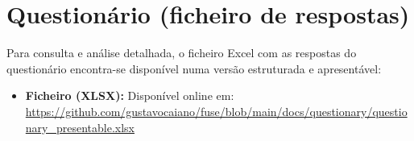 \section{Questionário (ficheiro de respostas)}
\label{AppendixA:questionario_xlsx}

Para consulta e análise detalhada, o ficheiro Excel com as respostas do questionário encontra-se disponível numa versão estruturada e apresentável:

\begin{itemize}
    \item \textbf{Ficheiro (XLSX):} Disponível online em: \url{https://github.com/gustavocaiano/fuse/blob/main/docs/questionary/questionary_presentable.xlsx}
\end{itemize}
